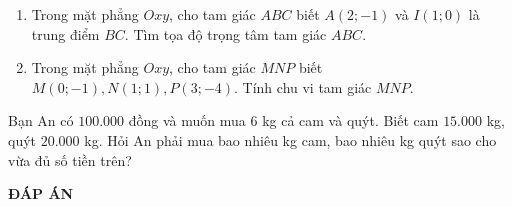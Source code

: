 \begin{bt}%
	
	\hfill
		\begin{enumerate}
			\item
			Trong mặt phẳng $Oxy$, cho tam giác $ABC$ biết $A(2;-1 )$ và $I(1;0 )$ là trung điểm $BC$. Tìm tọa độ trọng tâm tam giác $ABC$.
			\item
			Trong mặt phẳng $Oxy$, cho tam giác $MNP$ biết $M(0;-1 ),N(1;1 ),P(3;-4 )$. Tính chu vi tam giác $MNP$.
		\end{enumerate}

\end{bt}


\begin{bt}%
	
	Bạn An có $100.000$ đồng và muốn mua $6$ kg  cả cam và quýt. Biết cam $15.000$ kg, quýt $20.000$ kg. Hỏi An phải mua bao nhiêu kg cam, bao nhiêu kg quýt sao cho vừa đủ số tiền trên?

\end{bt}

\newpage
\begin{center}
	\textbf{ĐÁP ÁN}
\end{center}
\begin{multicols}{10}
	
\end{multicols}


